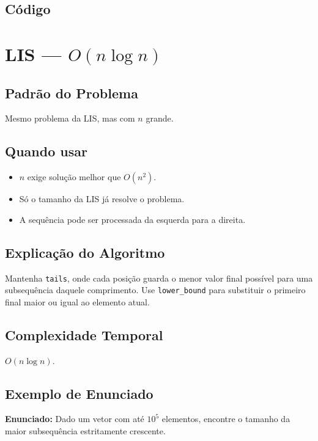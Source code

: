 \subsection{Código}

\section{LIS --- $O(n \log n)$}

\subsection{Padrão do Problema}
Mesmo problema da LIS, mas com $n$ grande.

\subsection{Quando usar}
\begin{itemize}[nosep]
  \item $n$ exige solução melhor que $O(n^2)$.
  \item Só o tamanho da LIS já resolve o problema.
  \item A sequência pode ser processada da esquerda para a direita.
\end{itemize}

\subsection{Explicação do Algoritmo}
Mantenha \texttt{tails}, onde cada posição guarda o menor valor final possível para uma subsequência daquele comprimento. Use \texttt{lower\_bound} para substituir o primeiro final maior ou igual ao elemento atual.

\subsection{Complexidade Temporal}
$O(n \log n)$.

\subsection{Exemplo de Enunciado}
\begin{exemplodiabox}
\textbf{Enunciado:} Dado um vetor com até $10^5$ elementos, encontre o tamanho da maior subsequência estritamente crescente.
\end{exemplodiabox}

